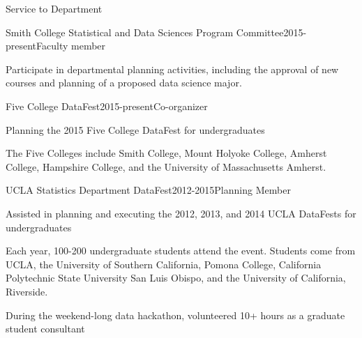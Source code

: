 \documentclass{resume} %
\begin{document}
\begin{rSection}{Service to Department}
\begin{rSubsection}{Smith College Statistical and Data Sciences Program Committee}{}{2015-present}{Faculty member}
\item Participate in departmental planning activities, including the approval of new courses and planning of a proposed data science major. 
\end{rSubsection}

\begin{rSubsection}{Five College DataFest}{}{2015-present}{Co-organizer}
\item Planning the 2015 Five College DataFest for undergraduates
\item The Five Colleges include Smith College, Mount Holyoke College, Amherst College, Hampshire College, and the University of Massachusetts Amherst. 
\end{rSubsection}

\begin{rSubsection}{UCLA Statistics Department DataFest}{}{2012-2015}{Planning Member}
\item Assisted in planning and executing the 2012, 2013, and 2014 UCLA DataFests for undergraduates
\item Each year, 100-200 undergraduate students attend the event. Students come from UCLA, the University of Southern California, Pomona College, California Polytechnic State University San Luis Obispo, and the University of California, Riverside. 
\item During the weekend-long data hackathon, volunteered 10+ hours as a graduate student consultant
\end{rSubsection}
\end{rSection}

\clearpage
\end{document}
